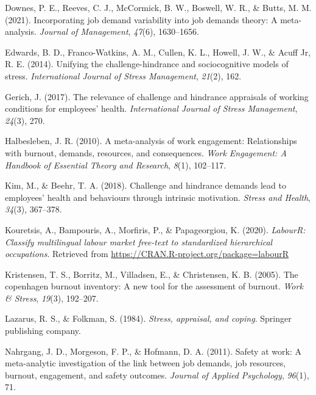 \documentclass[
  english,
  man]{apa6}
\begin{document}
\leavevmode\hypertarget{ref-downes2021incorporating}{}%
Downes, P. E., Reeves, C. J., McCormick, B. W., Boswell, W. R., \& Butts, M. M. (2021). Incorporating job demand variability into job demands theory: A meta-analysis. \emph{Journal of Management}, \emph{47}(6), 1630--1656.

\leavevmode\hypertarget{ref-edwards2014unifying}{}%
Edwards, B. D., Franco-Watkins, A. M., Cullen, K. L., Howell, J. W., \& Acuff Jr, R. E. (2014). Unifying the challenge-hindrance and sociocognitive models of stress. \emph{International Journal of Stress Management}, \emph{21}(2), 162.

\leavevmode\hypertarget{ref-gerich2017relevance}{}%
Gerich, J. (2017). The relevance of challenge and hindrance appraisals of working conditions for employees' health. \emph{International Journal of Stress Management}, \emph{24}(3), 270.

\leavevmode\hypertarget{ref-halbesleben2010meta}{}%
Halbesleben, J. R. (2010). A meta-analysis of work engagement: Relationships with burnout, demands, resources, and consequences. \emph{Work Engagement: A Handbook of Essential Theory and Research}, \emph{8}(1), 102--117.

\leavevmode\hypertarget{ref-kim2018challenge}{}%
Kim, M., \& Beehr, T. A. (2018). Challenge and hindrance demands lead to employees' health and behaviours through intrinsic motivation. \emph{Stress and Health}, \emph{34}(3), 367--378.

\leavevmode\hypertarget{ref-R-labourR}{}%
Kouretsis, A., Bampouris, A., Morfiris, P., \& Papageorgiou, K. (2020). \emph{LabourR: Classify multilingual labour market free-text to standardized hierarchical occupations}. Retrieved from \url{https://CRAN.R-project.org/package=labourR}

\leavevmode\hypertarget{ref-kristensen2005copenhagen}{}%
Kristensen, T. S., Borritz, M., Villadsen, E., \& Christensen, K. B. (2005). The copenhagen burnout inventory: A new tool for the assessment of burnout. \emph{Work \& Stress}, \emph{19}(3), 192--207.

\leavevmode\hypertarget{ref-lazarus1984stress}{}%
Lazarus, R. S., \& Folkman, S. (1984). \emph{Stress, appraisal, and coping}. Springer publishing company.

\leavevmode\hypertarget{ref-nahrgang2011safety}{}%
Nahrgang, J. D., Morgeson, F. P., \& Hofmann, D. A. (2011). Safety at work: A meta-analytic investigation of the link between job demands, job resources, burnout, engagement, and safety outcomes. \emph{Journal of Applied Psychology}, \emph{96}(1), 71.
\end{document}

